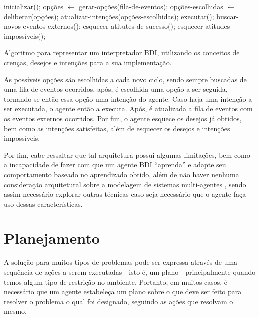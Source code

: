 \begin{algorithm}[htb]
\begin{center}
    \begin{algorithmic}[1]
        \STATE inicializar();
        \STATE
            \STATE opções $\gets$ gerar-opções(fila-de-eventos);
            \STATE opções-escolhidas $\gets$ deliberar(opções);
            \STATE atualizar-intenções(opções-escolhidas);
            \STATE executar();
            \STATE buscar-novos-eventos-externos();
            \STATE esquecer-atitutes-de-sucesso();
            \STATE esquecer-atitudes-impossíveis();
        \ENDWHILE
    \end{algorithmic}
\end{center}
\caption[Algoritmo para representar um interpretador BDI.]
    {\label{alg:BDIINTERPRETERALG}
        Algoritmo para representar um interpretador BDI, utilizando os conceitos
        de crenças, desejos e intenções para a sua implementação.}
\end{algorithm}

As possíveis opções são escolhidas a cada novo ciclo, sendo sempre buscadas de
uma fila de eventos ocorridos, após, é escolhida uma opção a ser seguida,
tornando-se então essa opção uma intenção do agente. Caso haja uma intenção a
ser executada, o agente então a executa. Após, é atualizada a fila de eventos
com os eventos externos ocorridos. Por fim, o agente esquece os desejos já
obtidos, bem como as intenções satisfeitas, além de esquecer os desejos e
intenções impossíveis.

Por fim, cabe ressaltar que tal arquitetura possui algumas limitações, bem como
a incapacidade de fazer com que um agente BDI ``aprenda'' e adapte seu
comportamento baseado no aprendizado obtido, além de não haver nenhuma
consideração arquitetural sobre a modelagem de sistemas multi-agentes
\cite{BDIMODELOFAGENCY}, sendo assim necessário explorar outras técnicas caso
seja necessário que o agente faça uso dessas características.

\section{Planejamento}

A solução para muitos tipos de problemas pode ser expressa através de uma
sequência de ações a serem executadas - isto é, um plano - principalmente quando
temos algum tipo de restrição no ambiente. Portanto, em muitos casos, é
necessário que um agente estabeleça um plano sobre o que deve ser feito para
resolver o problema o qual foi designado, seguindo as ações que resolvam o
mesmo.

